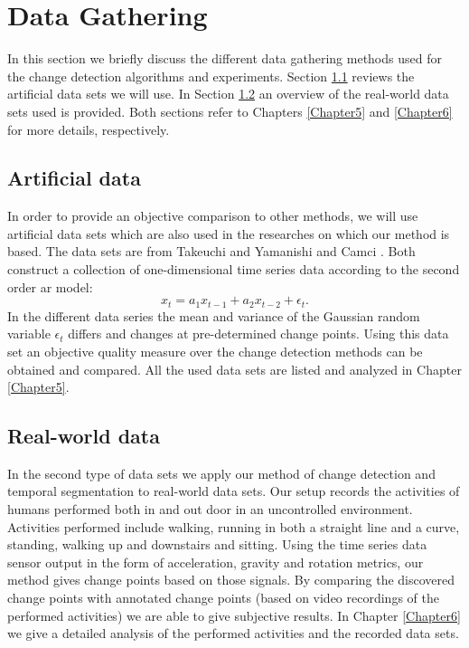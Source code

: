 \section{Data Gathering}\label{sec:method_data_gathering}
In this section we briefly discuss the different data gathering methods used for the change detection algorithms and experiments.
Section \ref{subsec:data_gathering_artificial} reviews the artificial data sets we will use.
In Section \ref{subsec:data_gathering_real_world} an overview of the real-world data sets used is provided.
Both sections refer to Chapters \ref{Chapter5} and \ref{Chapter6} for more details, respectively.

\subsection{Artificial data}\label{subsec:data_gathering_artificial}
In order to provide an objective comparison to other methods, we will use artificial data sets which are also used in the researches on which our method is based.
The data sets are from Takeuchi and Yamanishi \cite{takeuchi2006unifying} and Camci \cite{camci2010change}.
Both construct a collection of one-dimensional time series data according to the second order \gls{ar} model:
\begin{equation}
  x_t = a_1 x_{t-1} + a_2 x_{t-2} + \epsilon_t.
\end{equation}
In the different data series the mean and variance of the Gaussian random variable $\epsilon_t$ differs and changes at pre-determined change points.
Using this data set an objective quality measure over the change detection methods can be obtained and compared.
All the used data sets are listed and analyzed in Chapter \ref{Chapter5}.

\subsection{Real-world data}\label{subsec:data_gathering_real_world}
In the second type of data sets we apply our method of change detection and temporal segmentation to real-world data sets.
Our setup records the activities of humans performed both in and out door in an uncontrolled environment.
Activities performed include walking, running in both a straight line and a curve, standing, walking up and downstairs and sitting.
Using the time series data sensor output in the form of acceleration, gravity and rotation metrics, our method gives change points based on those signals.
By comparing the discovered change points with annotated change points (based on video recordings of the performed activities) we are able to give subjective results.
In Chapter \ref{Chapter6} we give a detailed analysis of the performed activities and the recorded data sets.